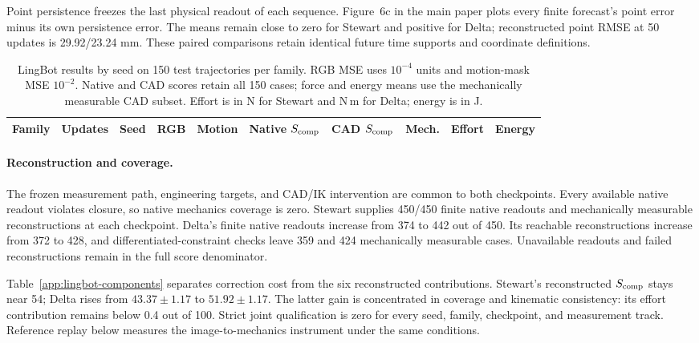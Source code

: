 \documentclass[10pt,twocolumn,letterpaper]{article}
\begin{document}
Point persistence freezes the last physical readout of each sequence. Figure~6c in the main paper plots every finite forecast's point error minus its own persistence error. The means remain close to zero for Stewart and positive for Delta; reconstructed point RMSE at 50 updates is 29.92/23.24 mm. These paired comparisons retain identical future time supports and coordinate definitions.

\begin{table}[t]
\caption{LingBot results by seed on 150 test trajectories per family. RGB MSE uses $10^{-4}$ units and motion-mask MSE $10^{-2}$. Native and CAD scores retain all 150 cases; force and energy means use the mechanically measurable CAD subset. Effort is in N for Stewart and N\,m for Delta; energy is in J.}
\label{app:lingbot-seeds}
\centering\small
\setlength{\tabcolsep}{4pt}
\begin{tabular}{llrrrrrrrr}
\toprule
Family & Updates & Seed & RGB & Motion & Native $S_{\rm comp}$ & CAD $S_{\rm comp}$ & Mech. & Effort & Energy\\
\midrule

\bottomrule
\end{tabular}
\end{table}

\paragraph{Reconstruction and coverage.}
The frozen measurement path, engineering targets, and CAD/IK intervention are common to both checkpoints. Every available native readout violates closure, so native mechanics coverage is zero. Stewart supplies 450/450 finite native readouts and mechanically measurable reconstructions at each checkpoint. Delta's finite native readouts increase from 374 to 442 out of 450. Its reachable reconstructions increase from 372 to 428, and differentiated-constraint checks leave 359 and 424 mechanically measurable cases. Unavailable readouts and failed reconstructions remain in the full score denominator.

Table~\ref{app:lingbot-components} separates correction cost from the six reconstructed contributions. Stewart's reconstructed $S_{\rm comp}$ stays near 54; Delta rises from $43.37\pm1.17$ to $51.92\pm1.17$. The latter gain is concentrated in coverage and kinematic consistency: its effort contribution remains below 0.4 out of 100. Strict joint qualification is zero for every seed, family, checkpoint, and measurement track. Reference replay below measures the image-to-mechanics instrument under the same conditions.
\end{document}
